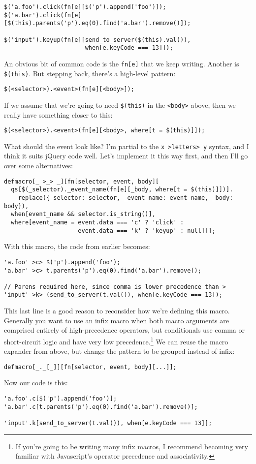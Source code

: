 \documentclass{report}
\begin{document}
\begin{verbatim}
$('a.foo').click(fn[e][$('p').append('foo')]);
$('a.bar').click(fn[e][$(this).parents('p').eq(0).find('a.bar').remove()]);

$('input').keyup(fn[e][send_to_server($(this).val()),
                       when[e.keyCode === 13]]);
\end{verbatim}

    An obvious bit of common code is the \verb|fn[e]| that we keep writing. Another is \verb|$(this)|. But stepping back, there's a high-level pattern:

\begin{verbatim}
$(<selector>).<event>(fn[e][<body>]);
\end{verbatim}

    If we assume that we're going to need \verb|$(this)| in the \verb|<body>| above, then we really have something closer to this:

\begin{verbatim}
$(<selector>).<event>(fn[e][<body>, where[t = $(this)]]);
\end{verbatim}

    What should the event look like? I'm partial to the \verb|x >letters> y| syntax, and I think it suits jQuery code well. Let's implement it this way first, and then I'll go over some
    alternatives:

\begin{verbatim}
defmacro[_ >_> _][fn[selector, event, body][
  qs[$(_selector)._event_name(fn[e][_body, where[t = $(this)]])].
    replace({_selector: selector, _event_name: event_name, _body: body}),
  when[event_name && selector.is_string()],
  where[event_name = event.data === 'c' ? 'click' :
                     event.data === 'k' ? 'keyup' : null]]];
\end{verbatim}

    With this macro, the code from earlier becomes:

\begin{verbatim}
'a.foo' >c> $('p').append('foo');
'a.bar' >c> t.parents('p').eq(0).find('a.bar').remove();

// Parens required here, since comma is lower precedence than >
'input' >k> (send_to_server(t.val()), when[e.keyCode === 13]);
\end{verbatim}

    This last line is a good reason to reconsider how we're defining this macro. Generally you want to use an infix macro when both macro arguments are comprised entirely of high-precedence
    operators, but conditionals use comma or short-circuit logic and have very low precedence.\footnote{If you're going to be writing many infix macros, I recommend becoming very familiar with
    Javascript's operator precedence and associativity.} We can reuse the macro expander from above, but change the pattern to be grouped instead of infix:

\begin{verbatim}
defmacro[_._[_]][fn[selector, event, body][...]];
\end{verbatim}

    Now our code is this:

\begin{verbatim}
'a.foo'.c[$('p').append('foo')];
'a.bar'.c[t.parents('p').eq(0).find('a.bar').remove()];

'input'.k[send_to_server(t.val()), when[e.keyCode === 13]];
\end{verbatim}
\end{document}
